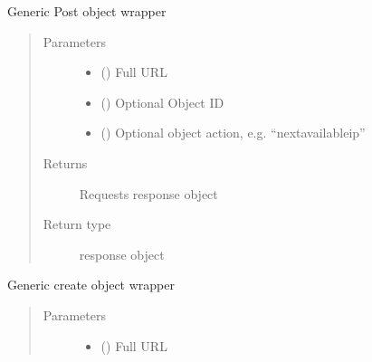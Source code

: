 \documentclass[letterpaper,10pt,english]{sphinxmanual}
\begin{document}
\begin{fulllineitems}
\begin{fulllineitems}
\label{\detokenize{bloxone-class:bloxone.b1.post}}
\sphinxAtStartPar
Generic Post object wrapper
\begin{quote}\begin{description}
\item[{Parameters}] \leavevmode\begin{itemize}
\item {} 
\sphinxAtStartPar
{} () \textendash{} Full URL

\item {} 
\sphinxAtStartPar
{} () \textendash{} Optional Object ID

\item {} 
\sphinxAtStartPar
{} () \textendash{} Optional object action, e.g. “nextavailableip”

\end{itemize}

\item[{Returns}] \leavevmode
\sphinxAtStartPar
Requests response object

\item[{Return type}] \leavevmode
\sphinxAtStartPar
response object

\end{description}\end{quote}

\end{fulllineitems}


\begin{fulllineitems}
\label{\detokenize{bloxone-class:bloxone.b1.replace}}
\sphinxAtStartPar
Generic create object wrapper
\begin{quote}\begin{description}
\item[{Parameters}] \leavevmode\begin{itemize}
\item {} 
\sphinxAtStartPar
{} () \textendash{} Full URL


\end{itemize}
\end{description}
\end{quote}
\end{fulllineitems}
\end{fulllineitems}
\end{document}
